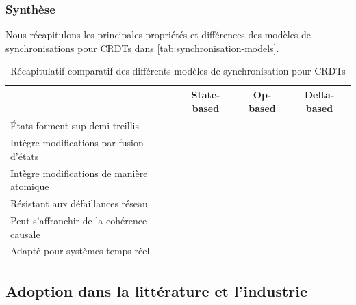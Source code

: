 \documentclass[12pt]{thesul}
\renewcommand{\checkmark}{\ding{51}}
\newcommand{\ballotx}{\ding{55}}
\begin{document}

\subsubsection{Synthèse}

Nous récapitulons les principales propriétés et différences des modèles de synchronisations pour \acp{CRDT} dans \autoref{tab:synchronisation-models}.

\begin{table}[!ht]
  \centering
  \caption{Récapitulatif comparatif des différents modèles de synchronisation pour \acp{CRDT}}
  \label{tab:synchronisation-models}
    \begin{tabular}{lccc}
      \toprule
                                                & State-based & Op-based    & Delta-based \\
      \midrule
      États forment sup-demi-treillis           & \checkmark  & \checkmark  & \checkmark  \\
      Intègre modifications par fusion d'états  & \checkmark  & \ballotx    & \checkmark  \\
      Intègre modifications de manière atomique & \ballotx    & \checkmark  & \checkmark  \\
      Résistant aux défaillances réseau         & \checkmark  & \ballotx    & \checkmark  \\
      Peut s'affranchir de la cohérence causale & \ballotx    & \checkmark  & \checkmark  \\
      Adapté pour systèmes temps réel           & \ballotx    & \checkmark  & \checkmark  \\
      \bottomrule
    \end{tabular}
\end{table}

\subsection{Adoption dans la littérature et l'industrie}

\end{document}
